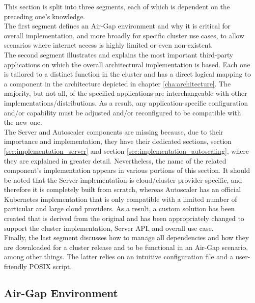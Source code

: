 This section is split into three segments, each of which is dependent on the preceding
one's knowledge. \\ %
The first segment defines an Air-Gap environment and why it is critical for overall
implementation, and more broadly for specific cluster use cases, to allow scenarios
where internet access is highly limited or even non-existent. \\ %
The second segment illustrates and explains the most important third-party applications
on which the overall architectural implementation is based. Each one is tailored
to a distinct function in the cluster and has a direct logical mapping to a
component in the architecture depicted in chapter \ref{cha:architecture}. The majority,
but not all, of the specified applications are interchangeable with other implementations/distributions.
As a result, any application-specific configuration and/or capability must be adjusted
and/or reconfigured to be compatible with the new one. \\ %
The Server and Autoscaler components are missing because, due to their
importance and implementation, they have their dedicated sections, section
\ref{sec:implementation_server} and section \ref{sec:implementation_autoscaling},
where they are explained in greater detail. Nevertheless, the name of the related
component's implementation appears in various portions of this section. It
should be noted that the Server implementation is cloud/cluster provider-specific,
and therefore it is completely built from scratch, whereas Autoscaler has an
official Kubernetes implementation that is only compatible with a limited number
of particular and large cloud providers. As a result, a custom solution has been
created that is derived from the original and has been appropriately changed to
support the cluster implementation, Server API, and overall use case. \\ %
Finally, the last segment discusses how to manage all dependencies and how they are
downloaded for a cluster release and to be functional in an Air-Gap scenario,
among other things. The latter relies on an intuitive configuration file and a user-friendly
POSIX script.

\subsection{Air-Gap Environment}
\label{subsec:implementation_dependencies_air_gap_environment}

